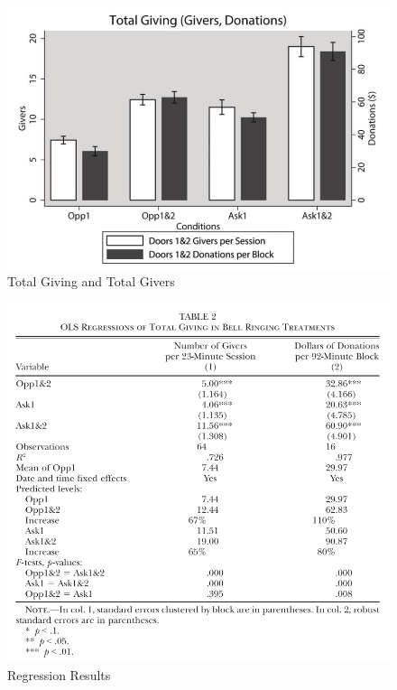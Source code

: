 \documentclass[../root]{subfiles}
\begin{document}
    \begin{figure}[t]
        \centering
        \includegraphics[width = .8\linewidth]{0821kato/fig3_1.png}
        \caption{Total Giving and Total Givers}
        \label{}
    \end{figure}

    \begin{figure}[t]
        \centering
        \includegraphics[width = .8\linewidth]{0821kato/fig4_1.png}
        \caption{Regression Results}
        \label{}
    \end{figure}
\end{document}
